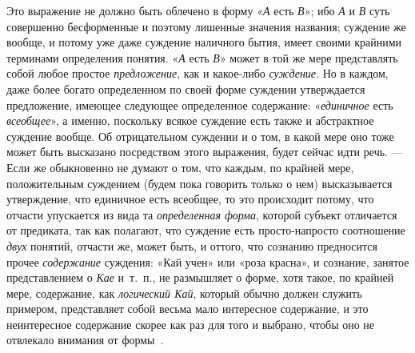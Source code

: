 \documentclass[twoside]{article}
\begin{document}
{{{{Это выражение не должно быть облечено в форму
«{\em А} есть
{\em В}»; ибо
{\em А} и
{\em В} суть совершенно
бесформенные и поэтому лишенные значения названия; суждение
же вообще, и потому уже даже суждение наличного бытия, имеет своими
крайними терминами определения понятия.
«{\em А} есть
{\em В}» может в той же
мере представлять собой любое простое
{\em предложение}, как и
какое-либо {\em суждение}.
Но в каждом, даже более богато определенном по своей форме
суждении утверждается предложение, имеющее следующее определенное
содержание: «{\em единичное}
есть {\em всеобщее}»,
а именно, поскольку всякое суждение есть также и абстрактное
суждение вообще. Об отрицательном суждении и о том, в какой мере оно тоже
может быть высказано посредством этого выражения, будет сейчас идти речь.
— Если же обыкновенно не думают о том, что каждым, по крайней
мере, положительным суждением (будем пока говорить только о нем)
высказывается утверждение, что единичное есть всеобщее, то это происходит
потому, что отчасти упускается из вида та
{\em определенная форма},
которой субъект отличается от предиката, так как полагают,
что суждение есть просто-напросто соотношение
{\em двух} понятий,
отчасти же, может быть, и оттого, что сознанию предносится прочее
{\em содержание}
суждения: «Кай учен» или «роза красна», и сознание, занятое
представлением о {\em Кае}
и~т.~п., не размышляет о форме, хотя такое, по крайней мере,
содержание, как {\em логический Кай},
который обычно должен служить примером, представляет собой
весьма мало интересное содержание, и это неинтересное содержание скорее как
раз для того и выбрано, чтобы оно не отвлекало внимания от
формы~\label{bkm:bm32}.

}}}}
\end{document}
